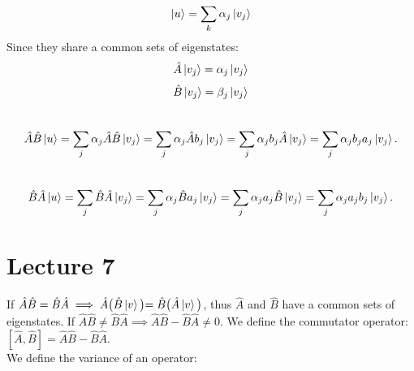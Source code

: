 \documentclass{article}
\begin{document}
$$\ket{u} = \sum_k \alpha_j \ket{v_j}$$
Since they share a common sets of eigenstates:
$$\hat{A}\ket{v_j} = \alpha_j \ket{v_j}$$ 
$$\hat{B}\ket{v_j} = \beta_j \ket{v_j}$$ \\ 

$$ \hat{A}\hat{B} \ket{u} = \sum_j \alpha_j \hat{A}\hat{B} \ket{v_j} = \sum_j \alpha_j \hat{A} b_j \ket{v_j} =  \sum_j \alpha_j  b_j \hat{A} \ket{v_j} = \sum_j \alpha_j b_j a_j \ket{v_j}. $$ \\ 
$$\hat{B}\hat{A}\ket{u}= \sum_j \hat{B}\hat{A}\ket{v_j} = \sum_j \alpha_j \hat{B}a_j \ket{v_j} = \sum_j \alpha_j a_j \hat{B}\ket{v_j} = \sum_j \alpha_j a_j b_j \ket{v_j}.$$

\section{Lecture 7}

If $\hat{A}\hat{B} = \hat{B}\hat{A} \implies \hat{A} \bigl( \hat{B} \ket{v} \bigl) = \hat{B} \bigl( \hat{A}\ket{v} \bigl)$, thus $\hat{A}$ and $\hat{B}$ have a common sets of eigenstates.
If $\hat{A}\hat{B} \neq \hat{B}\hat{A} \implies \hat{A}\hat{B} - \hat{B}\hat{A} \neq 0.$
We define the commutator operator: $[\hat{A},\hat{B} ] = \hat{A}\hat{B} - \hat{B}\hat{A}.$ \\
We define the variance of an operator: 
\end{document}
